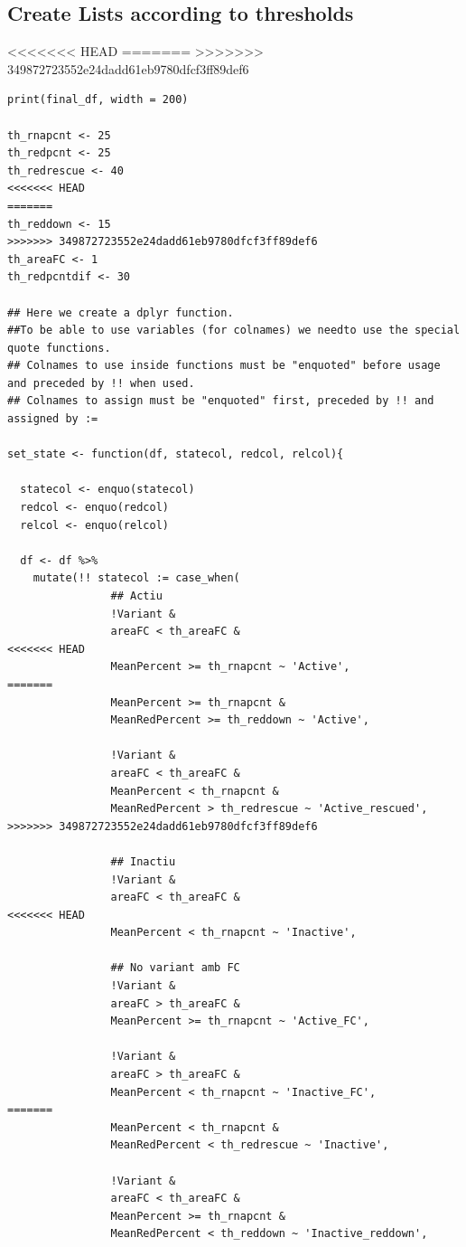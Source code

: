 \documentclass[11pt]{article}
\begin{document}
\subsection{Create Lists according to thresholds}
<<<<<<< HEAD
\label{sec:orgaed8bfb}
=======
\label{sec:org3367683}
>>>>>>> 349872723552e24dadd61eb9780dfcf3ff89def6
\begin{verbatim}
print(final_df, width = 200)

th_rnapcnt <- 25
th_redpcnt <- 25
th_redrescue <- 40
<<<<<<< HEAD
=======
th_reddown <- 15
>>>>>>> 349872723552e24dadd61eb9780dfcf3ff89def6
th_areaFC <- 1
th_redpcntdif <- 30

## Here we create a dplyr function.
##To be able to use variables (for colnames) we needto use the special quote functions.
## Colnames to use inside functions must be "enquoted" before usage and preceded by !! when used.
## Colnames to assign must be "enquoted" first, preceded by !! and assigned by :=

set_state <- function(df, statecol, redcol, relcol){

  statecol <- enquo(statecol)
  redcol <- enquo(redcol)
  relcol <- enquo(relcol)

  df <- df %>%
    mutate(!! statecol := case_when(
                ## Actiu
                !Variant &
                areaFC < th_areaFC &
<<<<<<< HEAD
                MeanPercent >= th_rnapcnt ~ 'Active',
=======
                MeanPercent >= th_rnapcnt &
                MeanRedPercent >= th_reddown ~ 'Active',

                !Variant &
                areaFC < th_areaFC &
                MeanPercent < th_rnapcnt &
                MeanRedPercent > th_redrescue ~ 'Active_rescued',
>>>>>>> 349872723552e24dadd61eb9780dfcf3ff89def6

                ## Inactiu
                !Variant &
                areaFC < th_areaFC &
<<<<<<< HEAD
                MeanPercent < th_rnapcnt ~ 'Inactive',

                ## No variant amb FC
                !Variant &
                areaFC > th_areaFC &
                MeanPercent >= th_rnapcnt ~ 'Active_FC',

                !Variant &
                areaFC > th_areaFC &
                MeanPercent < th_rnapcnt ~ 'Inactive_FC',
=======
                MeanPercent < th_rnapcnt &
                MeanRedPercent < th_redrescue ~ 'Inactive',

                !Variant &
                areaFC < th_areaFC &
                MeanPercent >= th_rnapcnt &
                MeanRedPercent < th_reddown ~ 'Inactive_reddown',


\end{verbatim}
\end{document}
